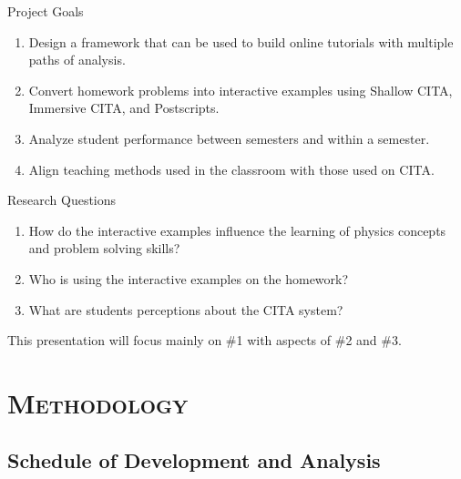 \documentclass[xcolor=x11names,compress]{beamer}
\begin{document}
\begin{frame}{Project Goals}
	\begin{enumerate}
		\item Design a framework that can be used to build online tutorials with multiple paths of analysis.
		\item Convert homework problems into interactive examples using Shallow CITA, Immersive CITA, and Postscripts.
		\item Analyze student performance between semesters and within a semester.
		\item Align teaching methods used in the classroom with those used on CITA.
	\end{enumerate}
\end{frame}

\begin{frame}{Research Questions}
	\begin{enumerate}
		\item How do the interactive examples influence the learning of physics concepts and problem solving skills?
		\vspace{5mm}
		\item Who is using the interactive examples on the homework?
		\vspace{5mm}
		\item What are students perceptions about the CITA system?
	\end{enumerate}
	\vspace{5mm}
	This presentation will focus mainly on \#1 with aspects of \#2 and \#3.
\end{frame}


\section{\scshape Methodology}

\subsection{Schedule of Development and Analysis}
\end{document}

